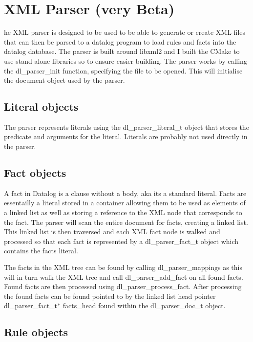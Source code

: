 \section*{X\+ML Parser (very Beta)}

he X\+ML parser is designed to be used to be able to generate or create X\+ML files that can then be parsed to a datalog program to load rules and facts into the datalog database. The parser is built around libxml2 and I built the C\+Make to use stand alone libraries so to ensure easier building. The parser works by calling the dl\+\_\+parser\+\_\+init function, specifying the file to be opened. This will initialise the document object used by the parser.

\subsection*{Literal objects}

The parser represents literals using the dl\+\_\+parser\+\_\+literal\+\_\+t object that stores the predicate and arguments for the literal. Literals are probably not used directly in the parser.

\subsection*{Fact objects}

A fact in Datalog is a clause without a body, aka it\textquotesingle{}s a standard literal. Facts are essentailly a literal stored in a container allowing them to be used as elements of a linked list as well as storing a reference to the X\+ML node that corresponds to the fact. The parser will scan the entire document for facts, creating a linked list. This linked list is then traversed and each X\+ML fact node is walked and processed so that each fact is represented by a dl\+\_\+parser\+\_\+fact\+\_\+t object which contains the fact\textquotesingle{}s literal.

The facts in the X\+ML tree can be found by calling dl\+\_\+parser\+\_\+mappings as this will in turn walk the X\+ML tree and call dl\+\_\+parser\+\_\+add\+\_\+fact on all found facts. Found facts are then processed using dl\+\_\+parser\+\_\+process\+\_\+fact. After processing the found facts can be found pointed to by the linked list head pointer dl\+\_\+parser\+\_\+fact\+\_\+t$\ast$ facts\+\_\+head found within the dl\+\_\+parser\+\_\+doc\+\_\+t object.

\subsection*{Rule objects}

